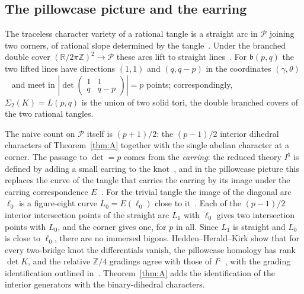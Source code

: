 \documentclass[11pt,reqno]{amsart}
\theoremstyle{plain}
\theoremstyle{definition}
\newcommand{\R}{\mathbb{R}}
\newcommand{\Z}{\mathbb{Z}}
\newcommand{\Inat}{I^{\natural}}
\newcommand{\pill}{\mathcal{P}}
\newcommand{\bp}{\mathfrak{b}}
\begin{document}
\subsection{The pillowcase picture and the earring}\label{sec:2bridge-pillow}
The traceless character variety of a rational tangle is a straight arc in $\pill$ joining two corners, of
rational slope determined by the tangle~\cite[Thm.~3]{HHK1}. Under the branched double cover
$(\R/2\pi\Z)^2\to\pill$ these arcs lift to straight lines~\cite{Lin,HHK1,CHKK}. For $\bp(p,q)$ the two
lifted lines have directions $(1,1)$ and $(q,q-p)$ in the coordinates $(\gamma,\theta)$~\cite[Thm.~3]{HHK1}
and meet in $|\det\left(\begin{smallmatrix}1&1\\q&q-p\end{smallmatrix}\right)|=p$ points; correspondingly,
$\Sigma_2(K)=L(p,q)$ is the union of two solid tori, the double branched covers of the two rational
tangles.

The naive count on $\pill$ itself is $(p+1)/2$: the $(p-1)/2$ interior dihedral characters of
Theorem~\ref{thm:A} together with the single abelian character at a corner. The passage to $\det=p$
comes from the \emph{earring}: the reduced theory $\Inat$ is defined by adding a small earring to the
knot~\cite[\S4.3]{KM2}, and in the pillowcase picture this replaces the curve of the tangle that carries
the earring by its image under the earring correspondence $E$~\cite{CHKK,HK}. For the trivial tangle the
image of the diagonal arc $\ell_0$ is a figure-eight curve $L_0=E(\ell_0)$ close to it~\cite[Thm.~1]{HHK1}.
Each of the $(p-1)/2$ interior intersection points of the straight arc $L_1$ with $\ell_0$ gives two
intersection points with $L_0$, and the corner gives one, for $p$ in all. Since $L_1$ is straight and
$L_0$ is close to $\ell_0$, there are no immersed bigons. Hedden--Herald--Kirk show that for every two-bridge knot the
differentials vanish, the pillowcase homology has rank $\det K$, and the relative $\Z/4$ gradings agree
with those of $\Inat$~\cite[\S7]{HHK2}, with the grading identification outlined in~\cite[\S6.1]{HHK2}.
Theorem~\ref{thm:A} adds the identification of the interior generators with the binary-dihedral
characters.
\end{document}
